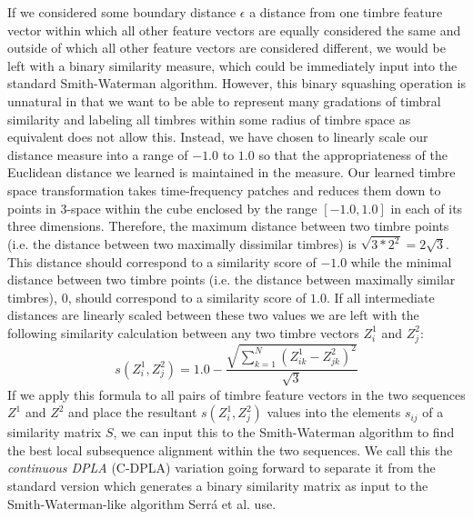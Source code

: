 \documentclass[12pt]{report} 	%
\numberwithin{figure}{chapter}
\numberwithin{table}{chapter}
\numberwithin{equation}{chapter}
\begin{document}
\begin{flushleft}
If we considered some boundary distance $\epsilon$ a distance from one timbre feature vector within which all other feature vectors are equally considered the same and outside of which all other feature vectors are considered different, we would be left with a binary similarity measure, which could be immediately input into the standard Smith-Waterman algorithm. However, this binary squashing operation is unnatural in that we want to be able to represent many gradations of timbral similarity and labeling all timbres within some radius of timbre space as equivalent does not allow this. Instead, we have chosen to linearly scale our distance measure into a range of $-1.0$ to $1.0$ so that the appropriateness of the Euclidean distance we learned is maintained in the measure. Our learned timbre space transformation takes time-frequency patches and reduces them down to points in 3-space within the cube enclosed by the range $[-1.0,1.0]$ in each of its three dimensions. Therefore, the maximum distance between two timbre points (i.e. the distance between two maximally dissimilar timbres) is $\sqrt{3*2^2} = 2\sqrt{3}$. This distance should correspond to a similarity score of $-1.0$ while the minimal distance between two timbre points (i.e. the distance between maximally similar timbres), $0$, should correspond to a similarity score of $1.0$. If all intermediate distances are linearly scaled between these two values we are left with the following similarity calculation between any two timbre vectors $Z_i^1$ and $Z_j^2$:
\begin{equation}
s(Z_i^1, Z_j^2) = 1.0-\frac{\sqrt{\sum_{k=1}^{N}(Z_{ik}^1 - Z_{jk}^2)^2}}{\sqrt{3}}
\end{equation}
If we apply this formula to all pairs of timbre feature vectors in the two sequences $Z^1$ and $Z^2$ and place the resultant $s(Z_i^1, Z_j^2)$ values into the elements $s_{ij}$ of a similarity matrix $S$, we can input this to the Smith-Waterman algorithm to find the best local subsequence alignment within the two sequences. We call this the \textit{continuous DPLA} (C-DPLA) variation going forward to separate it from the standard version which generates a binary similarity matrix as input to the Smith-Waterman-like algorithm Serr\'a et al. use.


\end{flushleft}
\end{document}
